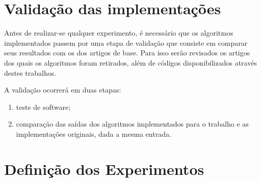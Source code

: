 
\section{Validação das implementações}

Antes de realizar-se qualquer experimento, é necessário que os algoritmos implementados passem por uma etapa de validação que consiste em comparar seus resultados com os dos artigos de base. Para isso serão revisados os artigos dos quais os algoritmos foram retirados, além de códigos disponibilizados através destes trabalhos.

A validação ocorrerá em duas etapas:

\begin{enumerate}
\item teste de software;
\item comparação das saídas dos algoritmos implementados para o trabalho e as implementações originais, dada a mesma entrada.
\end{enumerate}

\section{Definição dos Experimentos}
\label{sec:definicaoexperimentos}